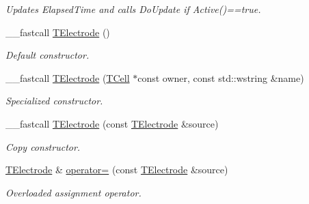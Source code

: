 \begin{DoxyCompactItemize}
\begin{DoxyCompactList}\small\item\em Updates Elapsed\+Time and calls Do\+Update if Active()==true. \end{DoxyCompactList}\item 
\hypertarget{class_t_electrode_a235d27bb3952e33f3a8e6496e3e2c8f0}{\+\_\+\+\_\+fastcall \hyperlink{class_t_electrode_a235d27bb3952e33f3a8e6496e3e2c8f0}{T\+Electrode} ()}\label{class_t_electrode_a235d27bb3952e33f3a8e6496e3e2c8f0}

\begin{DoxyCompactList}\small\item\em Default constructor. \end{DoxyCompactList}\item 
\hypertarget{class_t_electrode_abf72342739309a48a52037b684517099}{\+\_\+\+\_\+fastcall \hyperlink{class_t_electrode_abf72342739309a48a52037b684517099}{T\+Electrode} (\hyperlink{class_t_cell}{T\+Cell} $\ast$const owner, const std\+::wstring \&name)}\label{class_t_electrode_abf72342739309a48a52037b684517099}

\begin{DoxyCompactList}\small\item\em Specialized constructor. \end{DoxyCompactList}\item 
\hypertarget{class_t_electrode_a18e2f0d510f33cf19a1e62c94ad268b0}{\+\_\+\+\_\+fastcall \hyperlink{class_t_electrode_a18e2f0d510f33cf19a1e62c94ad268b0}{T\+Electrode} (const \hyperlink{class_t_electrode}{T\+Electrode} \&source)}\label{class_t_electrode_a18e2f0d510f33cf19a1e62c94ad268b0}

\begin{DoxyCompactList}\small\item\em Copy constructor. \end{DoxyCompactList}\item 
\hypertarget{class_t_electrode_a6686955e016c2bcea88c70d5b8a03b07}{\hyperlink{class_t_electrode}{T\+Electrode} \& \hyperlink{class_t_electrode_a6686955e016c2bcea88c70d5b8a03b07}{operator=} (const \hyperlink{class_t_electrode}{T\+Electrode} \&source)}\label{class_t_electrode_a6686955e016c2bcea88c70d5b8a03b07}

\begin{DoxyCompactList}\small\item\em Overloaded assignment operator. \end{DoxyCompactList}\end{DoxyCompactItemize}
